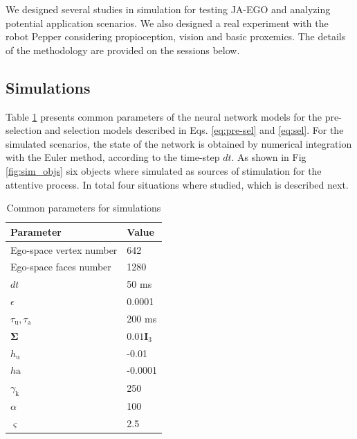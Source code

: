 \documentclass[letterpaper, 10 pt, conference]{ieeeconf}  %
\begin{document}
	We designed several studies in simulation for testing JA-EGO and analyzing potential application scenarios. We also designed a real experiment with the robot Pepper considering propioception, vision and basic proxemics. The details of the methodology are provided on the sessions below.

	
	\subsection{Simulations}
	
	Table \ref{tab:params} presents common parameters of the neural network models for the pre-selection and selection models described in Eqs. \eqref{eq:pre-sel} and \eqref{eq:sel}. For the simulated scenarios, the state of the network is obtained by numerical integration with the Euler method, according to the time-step $dt$. As shown in Fig \ref{fig:sim_objs} six objects where simulated as sources of stimulation for the attentive process. In total four situations where studied, which is described next. 
	
	\begin{table}[h!]
		\caption{Common parameters for simulations}
		\label{tab:params}
		\begin{center}
			\begin{tabular}{p{4.2cm} p{3.2cm}}
				\hline\textbf{Parameter} & \textbf{Value} \\\hline
				Ego-space vertex number & 642\\
				Ego-space faces number & 1280 \\
				$dt$ & 50 ms\\
				$\epsilon$ & 0.0001\\
				$\tau_{\mathrm{u}}, \tau_{\mathrm{a}}$ & 200 ms\\
				$\mathbf{\Sigma}$ & $0.01\mathbf{I}_3$ \\
				$h_\mathrm{u}$ & -0.01 \\
				$h\mathrm{a}$ & -0.0001 \\
				$\gamma_{\mathrm{k}}$ & 250\\
				$\alpha$ & 100 \\
				$\varsigma$ & 2.5 \\
				\hline
			\end{tabular}
		\end{center}
	\end{table}
	
\end{document}
